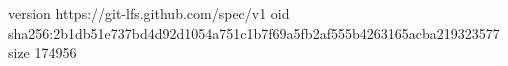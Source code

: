 version https://git-lfs.github.com/spec/v1
oid sha256:2b1db51e737bd4d92d1054a751c1b7f69a5fb2af555b4263165acba219323577
size 174956
